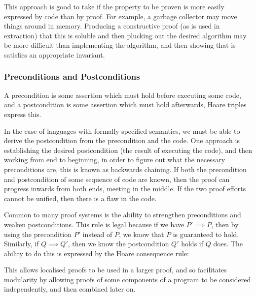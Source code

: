 This approach is good to take if the property to be proven is more
easily expressed by code than by proof. For example, a garbage
collector may move things around in memory. Producing a constructive
proof (as is used in extraction) that this is soluble and then
plucking out the desired algorithm may be more difficult than
implementing the algorithm, and then showing that is satisfies an
appropriate invariant.

\subsubsection{Preconditions and Postconditions}
\label{sec:lit-verification-embedding-conditions}

A precondition is some assertion which must hold before executing some
code, and a postcondition is some assertion which must hold
afterwards\cite{Hoare69}, Hoare triples express this.

In the case of languages with formally specified semantics, we must be
able to derive the postcondition from the precondition and the
code. One approach is establishing the desired postcondition (the
result of executing the code), and then working from end to beginning,
in order to figure out what the necessary preconditions are, this is
known as backwards chaining\cite{Russell05}. If both the precondition
and postcondition of some sequence of code are known, then the proof
can progress inwards from both ends, meeting in the middle. If the two
proof efforts cannot be unified, then there is a flaw in the code.

Common to many proof systems is the ability to strengthen
preconditions and weaken postconditions\cite{Hoare69}. This rule is
legal because if we have $P' \implies P$, then by using the
precondition $P'$ instead of $P$, we know that $P$ is guaranteed to
hold. Similarly, if $Q \implies Q'$, then we know the postcondition
$Q'$ holds if $Q$ does. The ability to do this is expressed by the
Hoare consequence rule:

\begin{prooftree}
\end{prooftree}

This allows localised proofs to be used in a larger proof, and so
facilitates modularity by allowing proofs of some components of a
program to be considered independently, and then combined later on.

